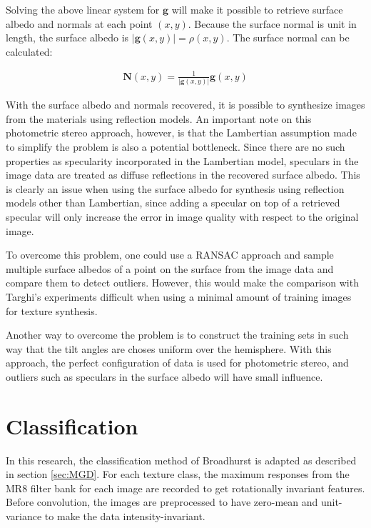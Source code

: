 \noindent Solving the above linear system for $\textbf{g}$ will make it possible to retrieve surface albedo and normals at each point $(x,y)$. Because the surface normal is unit in length, the surface albedo is $|\textbf{g}(x,y)| = \rho(x,y)$. The surface normal can be calculated:

	\begin{eqnarray*}
		\textbf{N}(x,y) = \frac{1}{|\textbf{g}(x,y)|}\textbf{g}(x,y)
	\end{eqnarray*}

\noindent With the surface albedo and normals recovered, it is possible to synthesize images from the materials using reflection models. An important note on this photometric stereo approach, however, is that the Lambertian assumption made to simplify the problem is also a potential bottleneck. Since there are no such properties as specularity incorporated in the Lambertian model, speculars in the image data are treated as diffuse reflections in the recovered surface albedo. This is clearly an issue when using the surface albedo for synthesis using reflection models other than Lambertian, since adding a specular on top of a retrieved specular will only increase the error in image quality with respect to the original image.

To overcome this problem, one could use a RANSAC approach and sample multiple surface albedos of a point on the surface from the image data and compare them to detect outliers. However, this would make the comparison with Targhi's experiments difficult when using a minimal amount of training images for texture synthesis.

Another way to overcome the problem is to construct the training sets in such way that the tilt angles are choses uniform over the hemisphere. With this approach, the perfect configuration of data is used for photometric stereo, and outliers such as speculars in the surface albedo will have small influence.

\section{Classification}\label{sec:Classification}

In this research, the classification method of Broadhurst is adapted as described in section \ref{sec:MGD}. For each texture class, the maximum responses from the MR8 filter bank for each image are recorded to get rotationally invariant features. Before convolution, the images are preprocessed to have zero-mean and unit-variance to make the data intensity-invariant.

